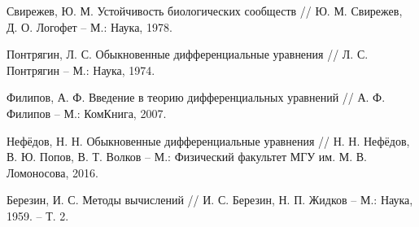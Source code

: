\begin{thebibliography}{9}
        Свирежев, Ю. М. Устойчивость биологических сообществ // Ю. М. Свирежев, Д. О. Логофет -- М.: Наука, 1978.

        Понтрягин, Л. С. Обыкновенные дифференциальные уравнения // Л. С. Понтрягин -- М.: Наука, 1974.

        Филипов, А. Ф. Введение в теорию дифференциальных уравнений // А. Ф. Филипов -- М.: КомКнига, 2007.
    
        Нефёдов, Н. Н. Обыкновенные дифференциальные уравнения // Н. Н. Нефёдов, В. Ю. Попов, В. Т. Волков -- М.: Физический факультет МГУ им. М. В. Ломоносова, 2016.

        Березин, И. С. Методы вычислений // И. С. Березин, Н. П. Жидков -- М.: Наука, 1959. -- Т. 2.

\end{thebibliography}